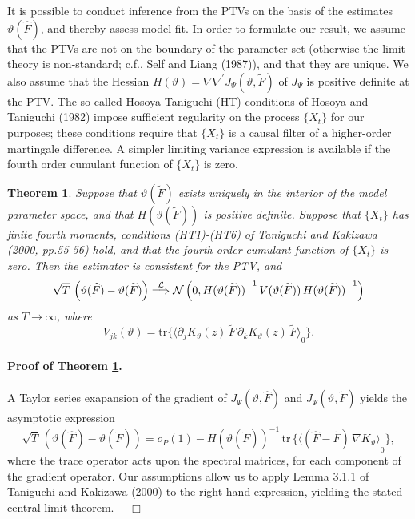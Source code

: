 \documentclass[a4paper]{book}
\def\convinlaw{\stackrel{{\cal L}}{\Longrightarrow }}
\def\tends{\rightarrow}
\newtheorem{Theorem}{Theorem}
\begin{document}
It is possible to conduct inference from the PTVs on the basis of the estimates 
$\vartheta (\widehat{F})$, and thereby assess model fit.  
 In order to formulate our result, we assume that the PTVs are not on the
 boundary of the parameter set (otherwise the limit theory
 is non-standard; c.f., Self and Liang (1987)), and  that they are unique. 
We also assume that the  Hessian  $H(\vartheta) = \nabla \nabla^{\prime}
  J_{\Psi} (\vartheta, \widetilde{F}) $  of $J_{\Psi} $ is positive definite at the PTV.
  The so-called Hosoya-Taniguchi (HT) conditions of Hosoya and Taniguchi (1982) 
impose sufficient regularity   on the process
 $\{ X_t \}$ for our purposes; these conditions require that $\{ X_t \}$ is a 
causal filter of a higher-order martingale difference.  
 A simpler limiting variance expression is available if the fourth order cumulant
 function of $\{ X_t \}$ is zero.  

\begin{Theorem}
\label{thm:LPP-Clt}
 Suppose that $\vartheta (\widetilde{F}) $ exists uniquely in the interior of the model 
 parameter space,   and that $H(\vartheta (\widetilde{F}))$ is 
 positive definite.  Suppose that $\{ X_t \}$ has finite fourth moments, conditions (HT1)-(HT6) of Taniguchi and Kakizawa (2000, pp.55-56)
 hold, and that the fourth order cumulant function of $\{ X_t \}$ is zero.  Then the estimator is consistent for the PTV, and
\[
 \sqrt{T} \, \left( \vartheta( \widehat{F} ) - \vartheta (\widetilde{F}) \right) 
 \convinlaw \mathcal{N} \left( 0, { H(\vartheta (\widetilde{F})) }^{-1} \, V (\vartheta (\widetilde{F})) \, { H(\vartheta (\widetilde{F})) }^{-1} \right)
\]
 as $T \tends \infty$, where 
\[
  V_{jk} (\vartheta) =  \mbox{tr} \{ { \langle  \partial_j K_{\vartheta} (z) \, \widetilde{F} \, \partial_k K_{\vartheta} (z) \, \widetilde{F} \rangle }_0 \}.
\]
\end{Theorem}

\paragraph{Proof of Theorem \ref{thm:LPP-Clt}.}
 A Taylor series exapansion of the gradient of $J_{\Psi} (\vartheta, \widehat{F})$ and $J_{\Psi} (\vartheta, \widetilde{F})$ yields the 
 asymptotic expression
\[
  \sqrt{T} \, \left( \vartheta( \widehat{F} ) - \vartheta (\widetilde{F}) \right)  = o_P (1) 
   - { H (\vartheta( \widetilde{F} )) }^{-1} \,  \mbox{tr} \, \{  {  \langle (\widehat{F} - \widetilde{F}) \, \nabla K_{\vartheta} \rangle }_0 \},
\]
 where the trace operator acts upon the spectral matrices, for each component of the gradient operator.  Our assumptions allow
 us to apply Lemma 3.1.1 of Taniguchi and Kakizawa (2000) to the right hand expression, yielding the stated central limit theorem.
 $\quad \Box$
\end{document}
